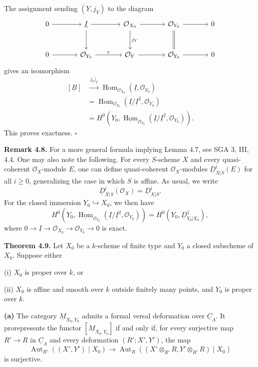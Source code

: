 The assignment sending $(Y,j_Y)$ to the diagram
\[
\begin{tikzcd}[column sep=large,row sep=large]
0 \arrow[r]
& \underline I \arrow[r] \arrow[d]
& \mathcal O_{X_0} \arrow[r] \arrow[d,"j_Y"]
& \mathcal O_{Y_0} \arrow[r] \arrow[d,equal]
& 0 \\
0 \arrow[r]
& \mathcal O_{Y_0} \arrow[r,"\varepsilon"]
& \mathcal O_Y \arrow[r]
& \mathcal O_{Y_0} \arrow[r]
& 0
\end{tikzcd}
\]
gives an isomorphism
\[
\begin{aligned}
[\underline B]
&\xrightarrow{\ j_Y|_{\underline I}\ }
\operatorname{Hom}_{\mathcal O_{X_0}}
 (\underline I,\mathcal O_{Y_0}) \\
&=
\operatorname{Hom}_{\mathcal O_{Y_0}}
 (\underline I/\underline I^2,\mathcal O_{Y_0}) \\
&=
H^0\!\left(
Y_0,
\underline{\operatorname{Hom}}_{\mathcal O_{Y_0}}
(\underline I/\underline I^2,\mathcal O_{Y_0})
\right).
\end{aligned}
\]
This proves exactness. \hfill$\square$


\medskip
\noindent\textbf{Remark 4.8.}
For a more general formula implying Lemma 4.7, see SGA 3, III, 4.4.
One may also note the following. For every $S$-scheme $X$ and every
quasi-coherent $\mathcal O_X$-module $E$, one can define
quasi-coherent $\mathcal O_X$-modules $\underline D^i_{X|S}(E)$ for
all $i\geq0$, generalizing the case in which $S$ is affine. As usual,
we write
\[
\underline D^i_{X|S}(\mathcal O_X)=\underline D^i_{X|S}.
\]
For the closed immersion $Y_0\hookrightarrow X_0$, we then have
\[
H^0\!\left(
Y_0,
\underline{\operatorname{Hom}}_{\mathcal O_{Y_0}}
(\underline I/\underline I^2,\mathcal O_{Y_0})
\right)
=H^0(Y_0,\underline D^1_{Y_0|X_0}),
\]
where
$0\longrightarrow\underline I\longrightarrow\mathcal O_{X_0}
\longrightarrow\mathcal O_{Y_0}\longrightarrow0$ is exact.

\medskip
\noindent\textbf{Theorem 4.9.}
Let $X_0$ be a $k$-scheme of finite type and $Y_0$ a closed
subscheme of $X_0$. Suppose either

\smallskip
\noindent(i) $X_0$ is proper over $k$, or

\noindent(ii) $X_0$ is affine and smooth over $k$ outside finitely
many points, and $Y_0$ is proper over $k$.

\smallskip
\noindent\textbf{(a)}
The category $\underline M_{X_0,Y_0}$ admits a formal versal
deformation over $\underline C_\Lambda$. It prorepresents the functor
$[\underline M_{X_0,Y_0}]$ if and only if, for every surjective map
$R'\longrightarrow R$ in $\underline C_\Lambda$ and every deformation
$(R';X',Y')$, the map
\[
\operatorname{Aut}_{R'}((X',Y')\mid X_0)
\longrightarrow
\operatorname{Aut}_{R}\!\left(
(X'\otimes_{R'}R,Y'\otimes_{R'}R)\mid X_0
\right)
\]
is surjective.

